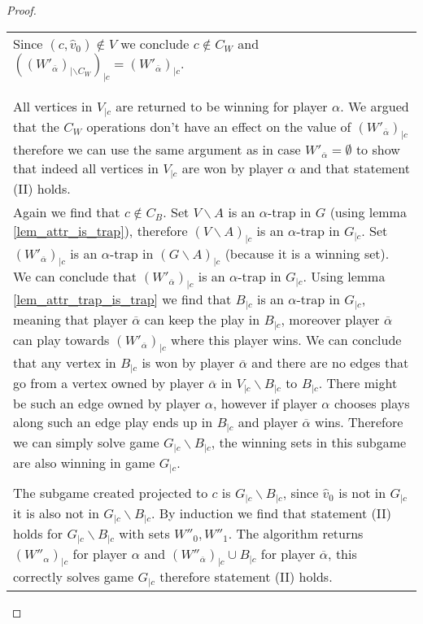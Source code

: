 \begin{theorem}
\begin{proof}
\begin{longtable}{|p{15.2cm}}
\begin{tabular}{|p{15cm}}
			\begin{tabular}{|p{14.8cm}}
				Case $W'_{\overline{\alpha}} \neq \emptyset$\\
				\hline
				Since $(c,\hat{v}_0) \notin V$ we conclude $c \notin C_W$ and $((W'_{\overline{\alpha}})_{|\backslash C_W})_{|c} = (W'_{\overline{\alpha}})_{|c}$.\\\\
				\begin{tabular}{|p{14.6cm}}
					Case $(W'_{\overline{\alpha}})_{|\backslash C} = \emptyset$\\
					\hline
					All vertices in $V_{|c}$ are returned to be winning for player $\alpha$. We argued that the $C_W$ operations don't have an effect on the value of $(W'_{\overline{\alpha}})_{|c}$ therefore we can use the same argument as in case $W'_{\overline{\alpha}} = \emptyset$ to show that indeed all vertices in $V_{|c}$ are won by player $\alpha$ and that statement (II) holds.
				\end{tabular}
				\begin{tabular}{|p{14.6cm}}
					Case $(W'_{\overline{\alpha}})_{|\backslash C} \neq \emptyset$\\
					\hline
					Again we find that $c \notin C_B$. Set $V \backslash A$ is an $\alpha$-trap in $G$ (using lemma \ref{lem_attr_is_trap}), therefore $(V \backslash A)_{|c}$ is an $\alpha$-trap in $G_{|c}$. Set $(W'_{\overline{\alpha}})_{|c}$ is an $\alpha$-trap in $(G\backslash A)_{|c}$ (because it is a winning set). We can conclude that $(W'_{\overline{\alpha}})_{|c}$ is an $\alpha$-trap in $G_{|c}$. Using lemma \ref{lem_attr_trap_is_trap} we find that $B_{|c}$ is an $\alpha$-trap in $G_{|c}$, meaning that player $\overline{\alpha}$ can keep the play in $B_{|c}$, moreover player $\overline{\alpha}$ can play towards $(W'_{\overline{\alpha}})_{|c}$ where this player wins. We can conclude that any vertex in $B_{|c}$ is won by player $\overline{\alpha}$ and there are no edges that go from a vertex owned by player $\overline{\alpha}$ in $V_{|c} \backslash B_{|c}$ to $B_{|c}$. There might be such an edge owned by player $\alpha$, however if player $\alpha$ chooses plays along such an edge play ends up in $B_{|c}$ and player $\overline{\alpha}$ wins. Therefore we can simply solve game $G_{|c} \backslash B_{|c}$, the winning sets in this subgame are also winning in game $G_{|c}$.\\\\			
					The subgame created projected to $c$ is $G_{|c} \backslash B_{|c}$, since $\hat{v}_0$ is not in $G_{|c}$ it is also not in $G_{|c} \backslash B_{|c}$. By induction we find that statement (II) holds for $G_{|c} \backslash B_{|c}$ with sets $W''_0,W''_1$. The algorithm returns $(W''_\alpha)_{|c}$ for player $\alpha$ and $(W''_{\overline{\alpha}})_{|c} \cup B_{|c}$ for player $\overline{\alpha}$, this correctly solves game $G_{|c}$ therefore statement (II) holds.

\end{tabular}
\end{tabular}
\end{tabular}
\end{longtable}
\end{proof}
\end{theorem}
